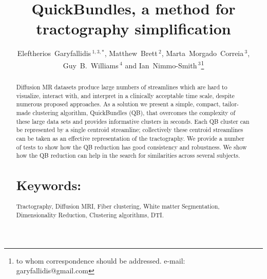 \documentclass{bioinfo}
\begin{document}

\title[QuickBundles]{QuickBundles, a method for tractography simplification}

\author[Garyfallidis, Brett, Correia, Williams and
Nimmo-Smith]{Eleftherios~Garyfallidis\,$^{1,3,*}$, Matthew~Brett\,$^{2}$,
  Marta~Morgado~Correia\,$^{3}$, Guy~B.~Williams\,$^{4}$ and
  Ian~Nimmo-Smith\,$^{3}$\footnote{to whom correspondence should be
    addressed. e-mail: garyfallidis@gmail.com}}

\address{\,$^{1}$Wolfson College, University of Cambridge, Cambridge, UK\\
  \,$^{2}$University of California, Henry H. Wheeler, Jr. Brain Imaging Center, Berkeley, CA.\\
  \,$^{3}$MRC Cognition and Brain Sciences Unit, Cambridge, UK.\\
  \,$^{4}$Wolfson Brain Imaging Centre, University of Cambridge,
  Cambridge, UK.}


\history{}

\editor{}

\maketitle

\begin{abstract}
\noindent
Diffusion MR datasets produce large numbers of streamlines which
are hard to visualize, interact with, and interpret in a clinically
acceptable time scale, despite numerous proposed approaches. As a
solution we present a simple, compact, tailor-made clustering algorithm,
QuickBundles (QB), that overcomes the complexity of these large data
sets and provides informative clusters in seconds. Each QB cluster can
be represented by a single centroid streamline; collectively these
centroid streamlines can be taken as an effective representation of the
tractography. We provide a number of tests to show how the QB reduction
has good consistency and robustness. We show how the QB reduction can
help in the search for similarities across several subjects.

\section{Keywords:} Tractography, Diffusion MRI, Fiber clustering, White
matter Segmentation, Dimensionality Reduction, Clustering algorithms, DTI.

\end{abstract}
\end{document}
